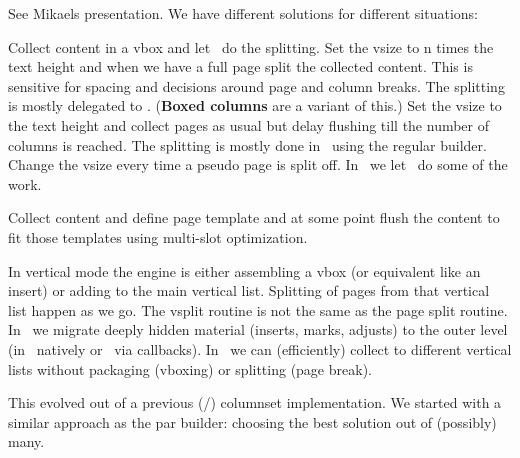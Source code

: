 \stoptitle

\starttitle[title={Columns}]

See Mikaels presentation. We have different solutions for different situations:


\startitemize
\startitem
     Collect content in a vbox and let \TEX\ do the
    splitting.
\stopitem
\startitem
     Set the vsize to n times the text height and
    when we have a full page split the collected content. This is sensitive for
    spacing and decisions around page and column breaks. The splitting is mostly
    delegated to \LUA. ({\bf Boxed columns} are a variant of this.)
\stopitem
\startitem
     Set the vsize to the text height and collect
    pages as usual but delay flushing till the number of columns is reached. The
    splitting is mostly done in \TEX\ using the regular builder.
\stopitem
\startitem
     Change the vsize every time a pseudo page is
    split off. In \MKIV\ we let \LUA\ do some of the work.
\stopitem

\blank

\startitem
     Collect content and define page template and
    at some point flush the content to fit those templates using multi-slot
    optimization.
\stopitem
\stopitemize

\stoptitle

\starttitle[title={Main vertical lists}]

\startitemize
\startitem
    In vertical mode the engine is either assembling a vbox (or equivalent like an insert)
    or adding to the main vertical list.
\stopitem
\startitem
    Splitting of pages from that vertical list happen as we go.
\stopitem
\startitem
    The vsplit routine is not the same as the page split routine.
\stopitem
\startitem
    In \CONTEXT\ we migrate deeply hidden material (inserts, marks, adjusts) to
    the outer level (in \LUAMETATEX\ natively or \MKIV\ via callbacks).
\stopitem
\startitem
    In \LUAMETATEX\ we can (efficiently) collect to different vertical lists
    without packaging (vboxing) or splitting (page break).
\stopitem
\stopitemize

\stoptitle

\starttitle[title={Balancing}]

\startitemize
\startitem
    This evolved out of a previous (\MKIV/\MKXL) columnset implementation.
\stopitem
\startitem
    We started with a similar approach as the par builder: choosing the best solution
    out of (possibly) many.
\stopitem

